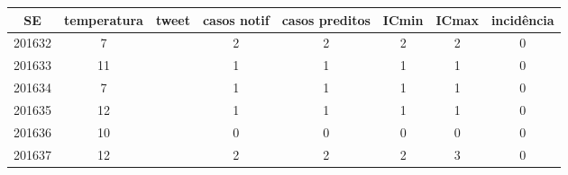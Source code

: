 \begin{tabular}{c|ccccccc}
  \hline
SE & temperatura & tweet & casos notif & casos preditos & ICmin & ICmax & incidência \\ 
  \hline
201632 & 7 &  & 2 & 2 & 2 & 2 & 0 \\ 
  201633 & 11 &  & 1 & 1 & 1 & 1 & 0 \\ 
  201634 & 7 &  & 1 & 1 & 1 & 1 & 0 \\ 
  201635 & 12 &  & 1 & 1 & 1 & 1 & 0 \\ 
  201636 & 10 &  & 0 & 0 & 0 & 0 & 0 \\ 
  201637 & 12 &  & 2 & 2 & 2 & 3 & 0 \\ 
   \hline
\end{tabular}
